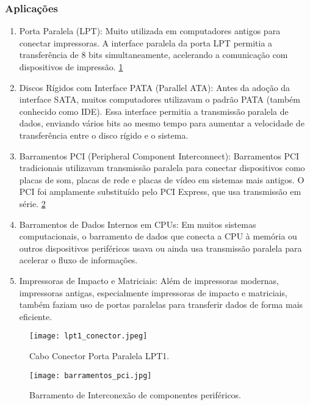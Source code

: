 \documentclass[12pt]{article}
\begin{document}
\subsubsection{Aplicações}
\begin{enumerate}
    \item Porta Paralela (LPT): Muito utilizada em computadores antigos para conectar impressoras. A interface paralela da porta LPT permitia a transferência de 8 bits simultaneamente, acelerando a comunicação com dispositivos de impressão. \ref{fig:Figura2}



    \item Discos Rígidos com Interface PATA (Parallel ATA): Antes da adoção da interface SATA, muitos computadores utilizavam o padrão PATA (também conhecido como IDE). Essa interface permitia a transmissão paralela de dados, enviando vários bits ao mesmo tempo para aumentar a velocidade de transferência entre o disco rígido e o sistema.

    \item Barramentos PCI (Peripheral Component Interconnect): Barramentos PCI tradicionais utilizavam transmissão paralela para conectar dispositivos como placas de som, placas de rede e placas de vídeo em sistemas mais antigos. O PCI foi amplamente substituído pelo PCI Express, que usa transmissão em série. \ref{fig:Figura3}

    \item Barramentos de Dados Internos em CPUs: Em muitos sistemas computacionais, o barramento de dados que conecta a CPU à memória ou outros dispositivos periféricos usava ou ainda usa transmissão paralela para acelerar o fluxo de informações.

    \item Impressoras de Impacto e Matriciais: Além de impressoras modernas, impressoras antigas, especialmente impressoras de impacto e matriciais, também faziam uso de portas paralelas para transferir dados de forma mais eficiente.
\end{enumerate}

\begin{figure}[h]
    \centering
    \texttt{[image: lpt1\_conector.jpeg]}
    \caption{Cabo Conector Porta Paralela LPT1.}
    \label{fig:Figura2}
\end{figure}

\begin{figure}[h]
    \centering
    \texttt{[image: barramentos\_pci.jpg]}
    \caption{Barramento de Interconexão de componentes periféricos.}
    \label{fig:Figura3}
\end{figure}
\end{document}
